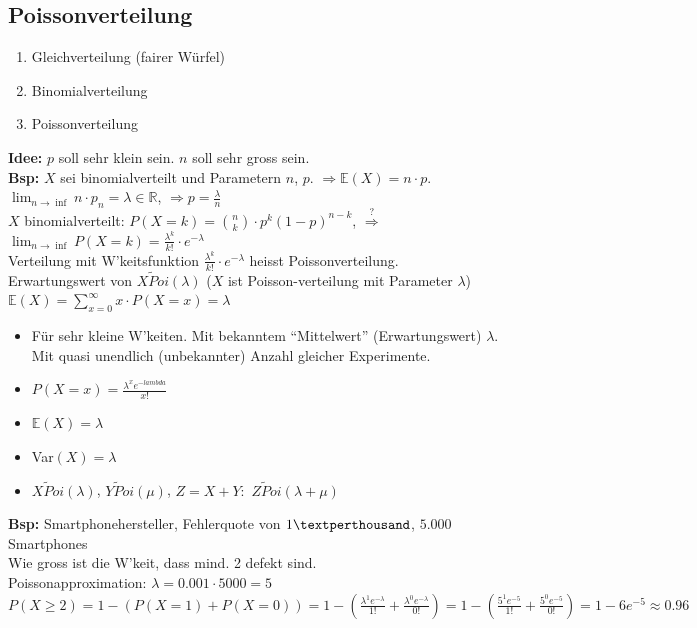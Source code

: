 \documentclass[a4paper,10pt]{article}
\newcommand{\RN}{\mathbb{R}} %
\newcommand{\EN}{\mathbb{E}}
\newcommand{\Bold}[1]{\textbf{#1}} %
\newcommand{\Ra}{\Rightarrow}
\newcommand{\Sumz}[2]{\sum_{#2=0}^{#1}} %
\newcommand{\Oben}[2]{\overset{#1}{#2}} %
\begin{document}
\subsection{Poissonverteilung}
\begin{enumerate}
 \item Gleichverteilung (fairer Würfel)
 \item Binomialverteilung
 \item Poissonverteilung
\end{enumerate}
\Bold{Idee:} $p$ soll sehr klein sein. $n$ soll sehr gross sein.\\
\Bold{Bsp:} $X$ sei binomialverteilt und Parametern $n$, $p$. $\Ra\EN(X)=n\cdot p$.\\
$\lim_{n\to\inf}n\cdot p_n=\lambda\in\RN$, $\Ra p=\frac{\lambda}{n}$\\
$X$ binomialverteilt: $P(X=k)={n\choose k}\cdot p^k(1-p)^{n-k}$, $\Oben{?}{\Ra}$ $\lim_{n\to\inf}P(X=k)=\frac{\lambda^k}{k!}\cdot e^{-\lambda}$\\
Verteilung mit W'keitsfunktion $\frac{\lambda^k}{k!}\cdot e^{-\lambda}$ heisst Poissonverteilung.\\
Erwartungswert von $X\tilde Poi(\lambda)$ ($X$ ist Poisson-verteilung mit Parameter $\lambda$)\\
$\EN(X)=\Sumz{\infty}{x}x\cdot P(X=x)=\lambda$
\begin{itemize}
 \item Für sehr kleine W'keiten. Mit bekanntem "`Mittelwert"' (Erwartungswert) $\lambda$. Mit quasi unendlich (unbekannter) Anzahl gleicher Experimente.
 \item $P(X=x)=\frac{\lambda^xe^{-lambda}}{x!}$
 \item $\EN(X)=\lambda$
 \item Var$(X)=\lambda$
 \item $X\tilde Poi(\lambda)$, $Y\tilde Poi(\mu)$, $Z=X+Y:$ $Z\tilde Poi(\lambda+\mu)$
\end{itemize}
\Bold{Bsp:} Smartphonehersteller, Fehlerquote von $1\textperthousand$, $5.000$ Smartphones\\
Wie gross ist die W'keit, dass mind. 2 defekt sind.\\
Poissonapproximation: $\lambda = 0.001\cdot 5000=5$\\
$P(X\geq 2)=1-(P(X=1)+P(X=0))=1-(\frac{\lambda^1e^{-\lambda}}{1!}+\frac{\lambda^0e^{-\lambda}}{0!})=1-(\frac{5^1e^{-5}}{1!}+\frac{5^0e^{-5}}{0!})=1-6e^{-5}\approx 0.96$
\end{document}
